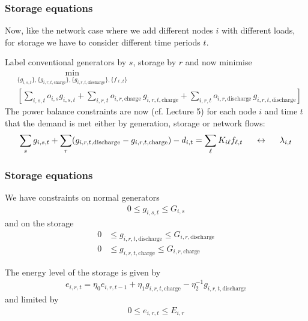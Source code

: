 \documentclass[10pt,aspectratio=169,dvipsnames]{beamer}
\def\l{\lambda}
\begin{document}
\begin{frame}[fragile]
  \frametitle{Storage equations}

  Now, like the network case where we add different nodes $i$
  with different loads, for storage we have to
  consider different time periods $t$.

  Label conventional generators by $s$, storage by $r$ and now minimise
  \begin{align*}
    &    \min_{\{g_{i,s,t}\},\{g_{i,r,t,\textrm{charge}}\},\{g_{i,r,t,\textrm{discharge}}\},\{f_{\ell,t}\}}\\
    &\left[  \sum_{i,s,t} o_{i,s} g_{i,s,t} +   \sum_{i,r,t} o_{i,r,\textrm{charge} }\, g_{i,r,t,\textrm{charge}} +   \sum_{i,r,t} o_{i,r,\textrm{discharge}}\, g_{i,r,t,\textrm{discharge}} \right]
  \end{align*}
  The power balance constraints are now (cf. Lecture 5) for each node $i$ and time $t$ that the demand is met either by generation, storage or network flows:
  \begin{align*}
    \sum_{s} g_{i,s,t} + \sum_{r}(g_{i,r,t,\textrm{discharge}} - g_{i,r,t,\textrm{charge}}) - d_{i,t} = \sum_\ell K_{i\ell}f_{\ell,t}  \hspace{0.5cm}\leftrightarrow\hspace{0.5cm} \l_{i,t}
  \end{align*}
\end{frame}

\begin{frame}[fragile]
  \frametitle{Storage equations}

  We have constraints on normal generators
    \begin{align*}
        0 \leq g_{i,s,t}  \leq  G_{i,s}
  \end{align*}
    and on the storage
    \begin{align*}
    0 & \leq g_{i,r,t,\textrm{discharge}} \leq G_{i,r,\textrm{discharge}} \\
    0 & \leq g_{i,r,t,\textrm{charge}} \leq G_{i,r,\textrm{charge}}
    \end{align*}

    The energy level of the storage is given by
  \begin{align*}
    e_{i,r,t} = \eta_0e_{i,r,t-1} + \eta_1g_{i,r,t,\textrm{charge}} -  \eta_2^{-1} g_{i,r,t,\textrm{discharge}}
  \end{align*}
  and limited by
  \begin{align*}
    0 \leq e_{i,r,t} \leq E_{i,r}
  \end{align*}

\end{frame}
\end{document}
